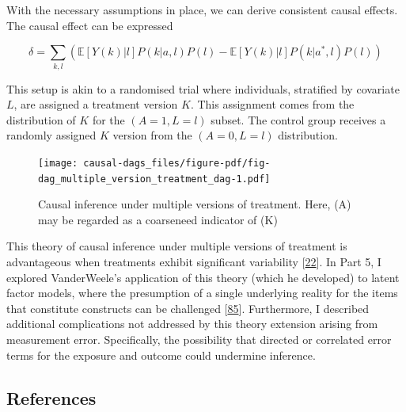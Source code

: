 \documentclass[
  singlecolumn]{article}
\begin{document}
With the necessary assumptions in place, we can derive consistent causal
effects. The causal effect can be expressed

\[\delta = \sum_{k,l} \left( \mathbb{E}[Y(k)|l] P(k|a,l) P(l) - \mathbb{E}[Y(k)|l] P(k|a^*,l) P(l) \right) \]

This setup is akin to a randomised trial where individuals, stratified
by covariate \(L\), are assigned a treatment version \(K\). This
assignment comes from the distribution of \(K\) for the
\((A = 1, L = l)\) subset. The control group receives a randomly
assigned \(K\) version from the \((A = 0, L = l)\) distribution.

\begin{figure}

{\centering \texttt{[image: causal-dags\_files/figure-pdf/fig-dag\_multiple\_version\_treatment\_dag-1.pdf]}

}

\caption{\label{fig-dag_multiple_version_treatment_dag}Causal inference
under multiple versions of treatment. Here, (A) may be regarded as a
coarseneed indicator of (K)}

\end{figure}

This theory of causal inference under multiple versions of treatment is
advantageous when treatments exhibit significant variability
{[}\protect\hyperlink{ref-vanderweele2013}{22}{]}. In Part 5, I explored
VanderWeele's application of this theory (which he developed) to latent
factor models, where the presumption of a single underlying reality for
the items that constitute constructs can be challenged
{[}\protect\hyperlink{ref-vanderweele2022}{85}{]}. Furthermore, I
described additional complications not addressed by this theory
extension arising from measurement error. Specifically, the possibility
that directed or correlated error terms for the exposure and outcome
could undermine inference.

\newpage{}

\hypertarget{references}{%
\subsection{References}\label{references}}
\end{document}
